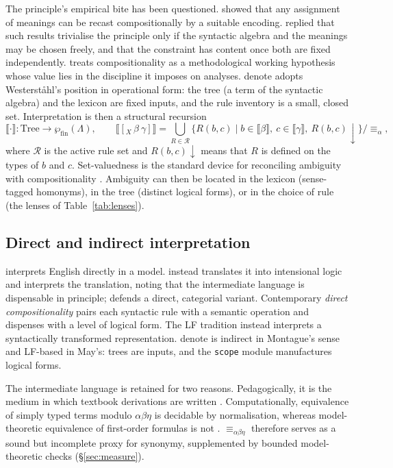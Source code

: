 \documentclass[11pt,a4paper]{article}
\newcommand{\den}[1]{\llbracket #1\rrbracket}
\newcommand{\dn}{\textsf{denote}}
\newcommand{\cmd}[1]{\texttt{#1}}
\theoremstyle{definition}
\begin{document}
The principle's empirical bite has been questioned. \citet{zadrozny1994} showed that any assignment of meanings can be recast compositionally by a suitable encoding. \citet{westerstahl1998} replied that such results trivialise the principle only if the syntactic algebra and the meanings may be chosen freely, and that the constraint has content once both are fixed independently. \citet{partee1984} treats compositionality as a methodological working hypothesis whose value lies in the discipline it imposes on analyses. \dn{} adopts Westerst{\aa}hl's position in operational form: the tree (a term of the syntactic algebra) and the lexicon are fixed inputs, and the rule inventory is a small, closed set. Interpretation is then a structural recursion
\begin{equation}\label{eq:interp}
\den{\cdot}:\mathrm{Tree}\to\wp_{\mathrm{fin}}(\Lambda),\qquad
\den{[_X\,\beta\ \gamma]}=\bigcup_{R\in\mathcal{R}}\big\{R(b,c)\;\big|\;b\in\den{\beta},\ c\in\den{\gamma},\ R(b,c)\!\downarrow\big\}\big/{\equiv_\alpha},
\end{equation}
where $\mathcal{R}$ is the active rule set and $R(b,c)\!\downarrow$ means that $R$ is defined on the types of $b$ and $c$. Set-valuedness is the standard device for reconciling ambiguity with compositionality \citep{janssen1997}. Ambiguity can then be located in the lexicon (sense-tagged homonyms), in the tree (distinct logical forms), or in the choice of rule (the lenses of Table~\ref{tab:lenses}).

\subsection{Direct and indirect interpretation}
\citet{montague1970efl} interprets English directly in a model. \citet{montague1973} instead translates it into intensional logic and interprets the translation, noting that the intermediate language is dispensable in principle; \citet{lewis1970} defends a direct, categorial variant. Contemporary \emph{direct compositionality} \citep{barkerjacobson2007,jacobson2014} pairs each syntactic rule with a semantic operation and dispenses with a level of logical form. The LF tradition \citep{may1977,may1985,heimkratzer1998} instead interprets a syntactically transformed representation. \dn{} is indirect in Montague's sense and LF-based in May's: trees are inputs, and the \cmd{scope} module manufactures logical forms.

The intermediate language is retained for two reasons. Pedagogically, it is the medium in which textbook derivations are written \citep{dowtywallpeters1981,gamut1991,heimkratzer1998}. Computationally, equivalence of simply typed terms modulo $\alpha\beta\eta$ is decidable by normalisation, whereas model-theoretic equivalence of first-order formulas is not \citep{church1936note}. $\equiv_{\alpha\beta\eta}$ therefore serves as a sound but incomplete proxy for synonymy, supplemented by bounded model-theoretic checks (\S\ref{sec:measure}).
\end{document}

